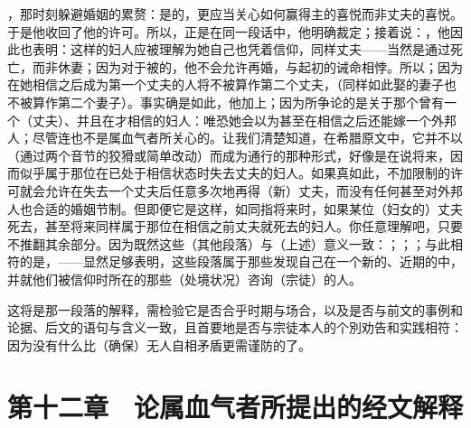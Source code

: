 ，那时刻躲避婚姻的累赘：是的，更应当关心如何赢得主的喜悦而非丈夫的喜悦。于是他收回了他的许可。所以，正是在同一段话中，他明确裁定；接着说：，他因此也表明：这样的妇人应被理解为她自己也凭着信仰，同样丈夫——当然是通过死亡，而非休妻；因为对于被的，他不会允许再婚，与起初的诫命相悖。所以；因为在她相信之后成为第一个丈夫的人将不被算作第二个丈夫，（同样如此娶的妻子也不被算作第二个妻子）。事实确是如此，他加上；因为所争论的是关于那个曾有一个（丈夫）、并且在才相信的妇人：唯恐她会以为甚至在相信之后还能嫁一个外邦人；尽管连也不是属血气者所关心的。让我们清楚知道，在希腊原文中，它并不以（通过两个音节的狡猾或简单改动）而成为通行的那种形式，好像是在说将来，因而似乎属于那位在已处于相信状态时失去丈夫的妇人。如果真如此，不加限制的许可就会允许在失去一个丈夫后任意多次地再得（新）丈夫，而没有任何甚至对外邦人也合适的婚姻节制。但即便它是这样，如同指将来时，如果某位（妇女的）丈夫死去，甚至将来同样属于那位在相信之前丈夫就死去的妇人。你任意理解吧，只要不推翻其余部分。因为既然这些（其他段落）与（上述）意义一致：；；；与此相符的是，——显然足够表明，这些段落属于那些发现自己在一个新的、近期的中，并就他们被信仰时所在的那些（处境状况）咨询（宗徒）的人。\par

这将是那一段落的解释，需检验它是否合乎时期与场合，以及是否与前文的事例和论据、后文的语句与含义一致，且首要地是否与宗徒本人的个別劝告和实践相符：因为没有什么比（确保）无人自相矛盾更需谨防的了。\par


\section{第十二章　论属血气者所提出的经文解释}

